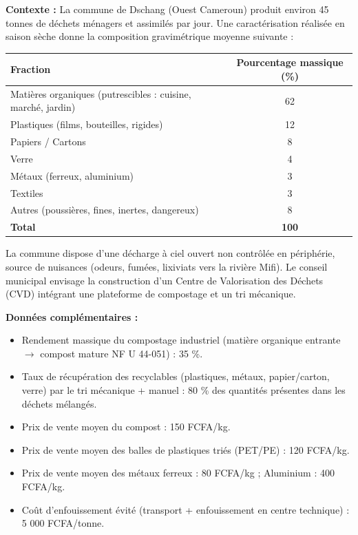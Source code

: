 \documentclass[11pt]{article}
\begin{document}
\begin{exercice}
\textbf{Contexte :} La commune de Dschang (Ouest Cameroun) produit environ 45 tonnes de déchets ménagers et assimilés par jour. Une caractérisation réalisée en saison sèche donne la composition gravimétrique moyenne suivante :
\begin{center}
\begin{tabular}{|l|c|}
\hline
\textbf{Fraction} & \textbf{Pourcentage massique (\%)} \\ \hline
Matières organiques (putrescibles : cuisine, marché, jardin) & 62 \\
Plastiques (films, bouteilles, rigides) & 12 \\
Papiers / Cartons & 8 \\
Verre & 4 \\
Métaux (ferreux, aluminium) & 3 \\
Textiles & 3 \\
Autres (poussières, fines, inertes, dangereux) & 8 \\ \hline
\textbf{Total} & \textbf{100} \\ \hline
\end{tabular}
\end{center}
La commune dispose d'une décharge à ciel ouvert non contrôlée en périphérie, source de nuisances (odeurs, fumées, lixiviats vers la rivière Mifi). Le conseil municipal envisage la construction d'un Centre de Valorisation des Déchets (CVD) intégrant une plateforme de compostage et un tri mécanique.

\textbf{Données complémentaires :}
\begin{itemize}
    \item Rendement massique du compostage industriel (matière organique entrante $\rightarrow$ compost mature NF U 44-051) : 35 \%.
    \item Taux de récupération des recyclables (plastiques, métaux, papier/carton, verre) par le tri mécanique + manuel : 80 \% des quantités présentes dans les déchets mélangés.
    \item Prix de vente moyen du compost : 150 FCFA/kg.
    \item Prix de vente moyen des balles de plastiques triés (PET/PE) : 120 FCFA/kg.
    \item Prix de vente moyen des métaux ferreux : 80 FCFA/kg ; Aluminium : 400 FCFA/kg.
    \item Coût d'enfouissement évité (transport + enfouissement en centre technique) : 5 000 FCFA/tonne.
\end{itemize}


\end{exercice}
\end{document}

